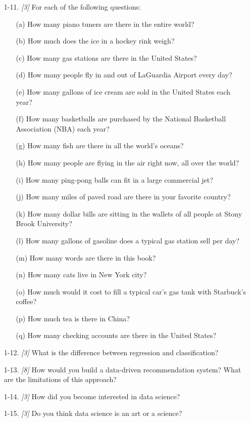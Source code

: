 \documentclass[10pt]{article}
\begin{document}
\begin{enumerate}
    \item[1-11.] \textit{[3]} For each of the following questions: 
    \begin{enumerate}
        \item[(a)] How many piano tuners are there in the entire world?
        \item[(b)] How much does the ice in a hockey rink weigh?
        \item[(c)] How many gas stations are there in the United States?
        \item[(d)] How many people fly in and out of LaGuardia Airport every day?
        \item[(e)] How many gallons of ice cream are sold in the United States each year?
        \item[(f)] How many basketballs are purchased by the National Basketball Association (NBA) each year?
        \item[(g)] How many fish are there in all the world’s oceans?
        \item[(h)] How many people are flying in the air right now, all over the world?
        \item[(i)] How many ping-pong balls can fit in a large commercial jet?
        \item[(j)] How many miles of paved road are there in your favorite country?
        \item[(k)] How many dollar bills are sitting in the wallets of all people at Stony Brook University?
        \item[(l)] How many gallons of gasoline does a typical gas station sell per day?
        \item[(m)] How many words are there in this book?
        \item[(n)] How many cats live in New York city?
        \item[(o)] How much would it cost to fill a typical car’s gas tank with Starbuck’s coffee?
        \item[(p)] How much tea is there in China?
        \item[(q)] How many checking accounts are there in the United States?
    \end{enumerate}

    \item[1-12.] \textit{[3]} What is the difference between regression and classification?\\

    \item[1-13.] \textit{[8]} How would you build a data-driven recommendation system? What are the limitations of this approach?\\

    \item[1-14.] \textit{[3]} How did you become interested in data science?\\

    \item[1-15.] \textit{[3]} Do you think data science is an art or a science?
\end{enumerate}
\end{document}
